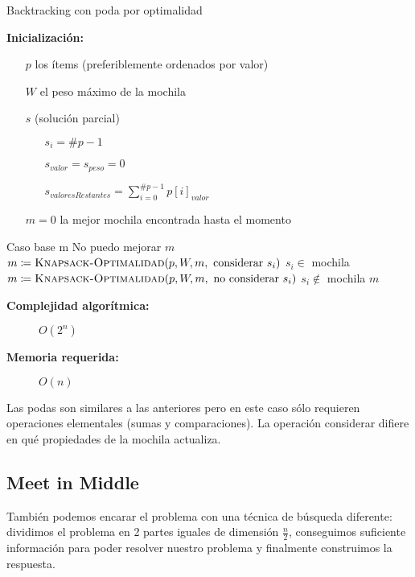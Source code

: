 \documentclass[fleqn, 11pt]{article}
\def\is{\coloneqq}
\begin{document}
\begin{algorithm}
\caption{Backtracking con poda por optimalidad}
\begin{algorithmic}[1]
\item[\textbf{Inicialización:}]
\item[] \begin{itemize}
	\item[] $p$ los ítems (preferiblemente ordenados por valor)
	\item[] $W$ el peso máximo de la mochila
	\item[] $s$ (solución parcial)
	\begin{itemize}
		\item[] $s_i = \#p - 1$
		\item[] $s_{valor} = s_{peso} = 0$
		\item[] $s_{valoresRestantes} = \sum_{i = 0}^{\#p - 1} p[i]_{valor}$
	\end{itemize}
	\item[] $m = 0$ la mejor mochila encontrada hasta el momento
\end{itemize}
\Statex
{}
	\Comment Caso base
	\State \Return m
\EndIf
{}
	\Comment No puedo mejorar
	\State \Return $m$
\EndIf
{}
	\State $m \is \Call{Knapsack-Optimalidad}{p, W, m, \text{ considerar } s_i}$
	\Comment $s_i \in$ mochila
\EndIf
\State $m \is \Call{Knapsack-Optimalidad}{p, W, m, \text{ no considerar } s_i}$
\Comment $s_i \not\in$ mochila
\State \Return $m$
\EndFunction
\end{algorithmic}
\begin{description}
	\item[\textbf{Complejidad algorítmica:}] $O(2^n)$
	\item[\textbf{Memoria requerida:}] $O(n)$
\end{description}
\end{algorithm}

Las podas son similares a las anteriores pero en este caso sólo requieren
operaciones elementales (sumas y comparaciones). La operación considerar
difiere en qué propiedades de la mochila actualiza.

\subsection{Meet in Middle}

También podemos encarar el problema con una técnica de búsqueda diferente:
dividimos el problema en 2 partes iguales de dimensión $\frac{n}{2}$,
conseguimos suficiente información para poder resolver nuestro problema y
finalmente construimos la respuesta.
\end{document}
